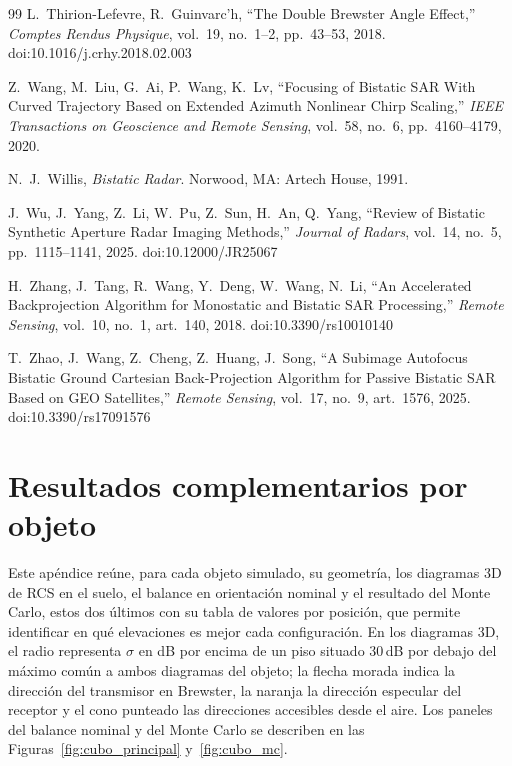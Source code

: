 \documentclass[11pt,a4paper]{report}
\begin{document}
\begin{thebibliography}{99}
 L.~Thirion-Lefevre, R.~Guinvarc'h, ``The Double Brewster Angle Effect,'' \emph{Comptes Rendus Physique}, vol.~19, no.~1--2, pp.~43--53, 2018. doi:10.1016/j.crhy.2018.02.003

 Z.~Wang, M.~Liu, G.~Ai, P.~Wang, K.~Lv, ``Focusing of Bistatic SAR With Curved Trajectory Based on Extended Azimuth Nonlinear Chirp Scaling,'' \emph{IEEE Transactions on Geoscience and Remote Sensing}, vol.~58, no.~6, pp.~4160--4179, 2020.

 N.~J.~Willis, \emph{Bistatic Radar}. Norwood, MA: Artech House, 1991.

 J.~Wu, J.~Yang, Z.~Li, W.~Pu, Z.~Sun, H.~An, Q.~Yang, ``Review of Bistatic Synthetic Aperture Radar Imaging Methods,'' \emph{Journal of Radars}, vol.~14, no.~5, pp.~1115--1141, 2025. doi:10.12000/JR25067

 H.~Zhang, J.~Tang, R.~Wang, Y.~Deng, W.~Wang, N.~Li, ``An Accelerated Backprojection Algorithm for Monostatic and Bistatic SAR Processing,'' \emph{Remote Sensing}, vol.~10, no.~1, art.~140, 2018. doi:10.3390/rs10010140

 T.~Zhao, J.~Wang, Z.~Cheng, Z.~Huang, J.~Song, ``A Subimage Autofocus Bistatic Ground Cartesian Back-Projection Algorithm for Passive Bistatic SAR Based on GEO Satellites,'' \emph{Remote Sensing}, vol.~17, no.~9, art.~1576, 2025. doi:10.3390/rs17091576

\end{thebibliography}

\appendix
\chapter{Resultados complementarios por objeto}
\label{ap:figuras}

Este apéndice reúne, para cada objeto simulado, su geometría, los
diagramas 3D de RCS en el suelo, el balance en orientación nominal y el
resultado del Monte Carlo, estos dos últimos con su tabla de valores por
posición, que permite identificar en qué elevaciones es mejor cada
configuración. En los diagramas 3D, el radio representa
$\sigma$ en dB por encima de un piso situado 30\,dB por debajo del máximo
común a ambos diagramas del objeto; la flecha morada indica la dirección del
transmisor en Brewster, la naranja la dirección especular del receptor y el
cono punteado las direcciones accesibles desde el aire. Los paneles del
balance nominal y del Monte Carlo se describen en las
Figuras~\ref{fig:cubo_principal} y~\ref{fig:cubo_mc}.
\end{document}
